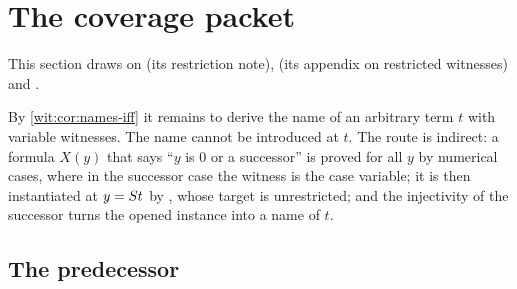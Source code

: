 \section{The coverage packet}
\label{wit:sec:packet}

This section draws on  (its restriction note),
 (its appendix on restricted witnesses) and
.

By \cref{wit:cor:names-iff} it remains to derive the name of an arbitrary
term $t$ with variable witnesses.  The name cannot be introduced at $t$.
The route is indirect: a formula $X(y)$ that says ``$y$ is $0$ or a
successor'' is proved for all $y$ by numerical cases, where in the successor
case the witness is the case variable; it is then instantiated at
$y=S t$ by , whose target is unrestricted; and the
injectivity of the successor turns the opened instance into a name of $t$.

\subsection{The predecessor}

